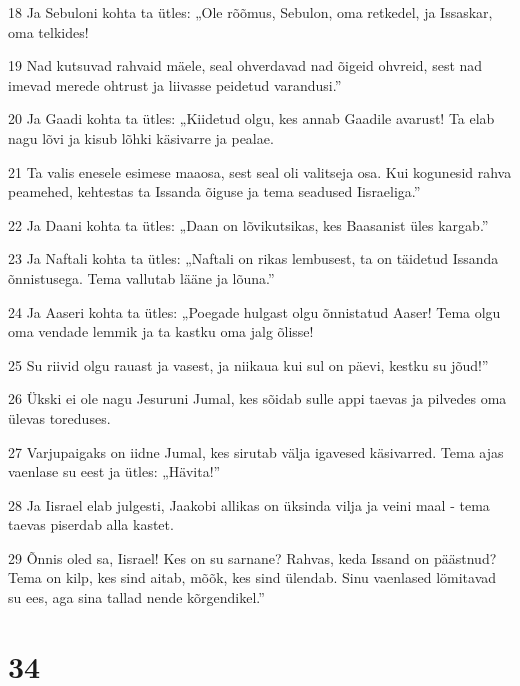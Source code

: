 \par 18 Ja Sebuloni kohta ta ütles: „Ole rõõmus, Sebulon, oma retkedel, ja Issaskar, oma telkides!
\par 19 Nad kutsuvad rahvaid mäele, seal ohverdavad nad õigeid ohvreid, sest nad imevad merede ohtrust ja liivasse peidetud varandusi.”
\par 20 Ja Gaadi kohta ta ütles: „Kiidetud olgu, kes annab Gaadile avarust! Ta elab nagu lõvi ja kisub lõhki käsivarre ja pealae.
\par 21 Ta valis enesele esimese maaosa, sest seal oli valitseja osa. Kui kogunesid rahva peamehed, kehtestas ta Issanda õiguse ja tema seadused Iisraeliga.”
\par 22 Ja Daani kohta ta ütles: „Daan on lõvikutsikas, kes Baasanist üles kargab.”
\par 23 Ja Naftali kohta ta ütles: „Naftali on rikas lembusest, ta on täidetud Issanda õnnistusega. Tema vallutab lääne ja lõuna.”
\par 24 Ja Aaseri kohta ta ütles: „Poegade hulgast olgu õnnistatud Aaser! Tema olgu oma vendade lemmik ja ta kastku oma jalg õlisse!
\par 25 Su riivid olgu rauast ja vasest, ja niikaua kui sul on päevi, kestku su jõud!”
\par 26 Ükski ei ole nagu Jesuruni Jumal, kes sõidab sulle appi taevas ja pilvedes oma ülevas toreduses.
\par 27 Varjupaigaks on iidne Jumal, kes sirutab välja igavesed käsivarred. Tema ajas vaenlase su eest ja ütles: „Hävita!”
\par 28 Ja Iisrael elab julgesti, Jaakobi allikas on üksinda vilja ja veini maal - tema taevas piserdab alla kastet.
\par 29 Õnnis oled sa, Iisrael! Kes on su sarnane? Rahvas, keda Issand on päästnud? Tema on kilp, kes sind aitab, mõõk, kes sind ülendab. Sinu vaenlased lömitavad su ees, aga sina tallad nende kõrgendikel.”

\chapter{34}

